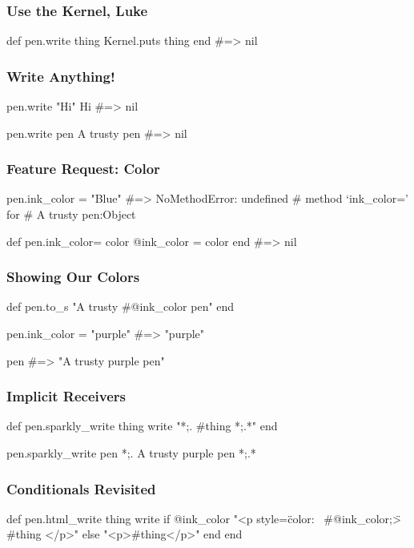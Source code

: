 \documentclass[20pt,aspectratio=169]{beamer}
\begin{document}
\begin{frame}[fragile]
\frametitle{Use the Kernel, Luke}
\begin{rubycode}
def pen.write thing
  Kernel.puts thing
end
#=> nil
\end{rubycode}
\end{frame}

\begin{frame}[fragile]
\frametitle{Write Anything!}
\begin{rubycode}
pen.write "Hi"
Hi
#=> nil

pen.write pen
A trusty pen
#=> nil
\end{rubycode}
\end{frame}

\begin{frame}[fragile]
\frametitle{Feature Request: Color}
\begin{rubycode}
pen.ink_color = "Blue"
#=> NoMethodError: undefined
# method `ink_color=' for
# A trusty pen:Object

def pen.ink_color= color
  @ink_color = color
end
#=> nil
\end{rubycode}
\end{frame}

\begin{frame}[fragile]
\frametitle{Showing Our Colors}
\begin{rubycode}
def pen.to_s
  "A trusty #{@ink_color} pen"
end

pen.ink_color = "purple"
#=> "purple"

pen
#=> "A trusty purple pen"
\end{rubycode}
\end{frame}

\begin{frame}[fragile]
\frametitle{Implicit Receivers}
\begin{rubycode}
def pen.sparkly_write thing
  write "*;. #{thing} *;.*"
end

pen.sparkly_write pen
*;. A trusty purple pen *;.*
\end{rubycode}
\end{frame}

\begin{frame}[fragile]
\frametitle{Conditionals Revisited}
\begin{rubycode}
def pen.html_write thing
  write if @ink_color
    "<p style=\"color: \
    #{@ink_color};\">
      #{thing}
    </p>"
  else
    "<p>#{thing}</p>"
  end
end
\end{rubycode}
\end{frame}
\end{document}

